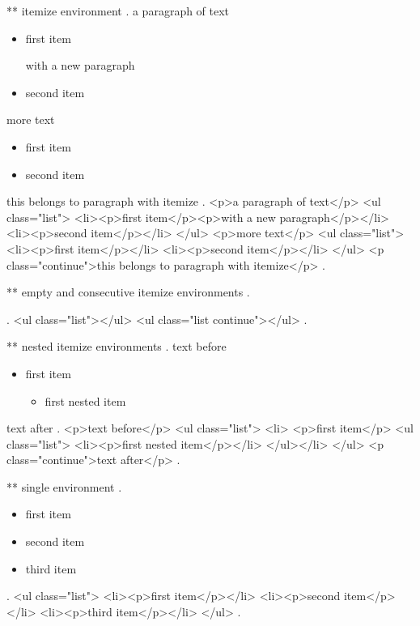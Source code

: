 ** itemize environment
.
a paragraph of text

\begin{itemize}
    \item first item

        with a new paragraph
    \item second item
\end{itemize}
%

more text

\begin{itemize}
    \item first item
    \item second item
\end{itemize}
this belongs to paragraph with itemize
.
<p>a paragraph of text</p>
<ul class="list">
<li><p>ﬁrst item</p><p>with a new paragraph</p></li>
<li><p>second item</p></li>
</ul>
<p>more text</p>
<ul class="list">
<li><p>ﬁrst item</p></li>
<li><p>second item</p></li>
</ul>
<p class="continue">this belongs to paragraph with itemize</p>
.


** empty and consecutive itemize environments
.
\begin{itemize}
\end{itemize}
\begin{itemize}
\end{itemize}
.
<ul class="list"></ul>
<ul class="list continue"></ul>
.


** nested itemize environments
.
text before
\begin{itemize}
    \item first item
        \begin{itemize}
            \item first nested item
        \end{itemize}
\end{itemize}
text after
.
<p>text before</p>
<ul class="list">
<li>
<p>ﬁrst item</p>
<ul class="list">
<li><p>ﬁrst nested item</p></li>
</ul></li>
</ul>
<p class="continue">text after</p>
.


** single environment
.
\begin{itemize}
    \item first item
    \item second item
    \item third item
\end{itemize}
.
<ul class="list">
<li><p>ﬁrst item</p></li>
<li><p>second item</p></li>
<li><p>third item</p></li>
</ul>
.



